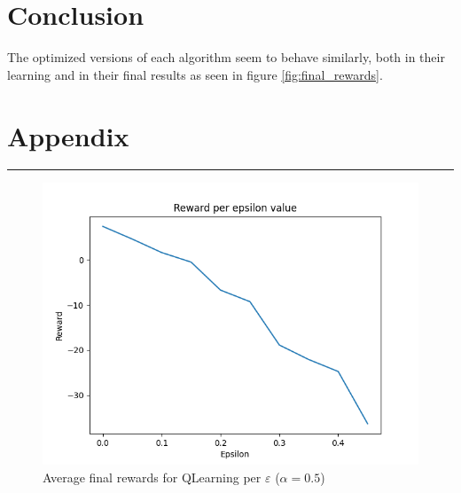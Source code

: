 \documentclass[11pt]{article}
\begin{document}
\section*{Conclusion}

The optimized versions of each algorithm seem to behave similarly, both in their learning and in their final results as seen in figure \ref{fig:final_rewards}.

\newpage


\section*{Appendix}

\vspace{-1.5em}
\rule{\textwidth}{0.5pt}

\vspace{1em}

\begin{figure}[H]
	\centering
	\includegraphics[width=12cm]{../figures/part_1/learning_reward_qlearning_eps_search.png}
	\caption{Average final rewards for QLearning per $\varepsilon$ ($\alpha = 0.5$)}
	\label{fig:qlearning_eps_search}
\end{figure}
\end{document}

